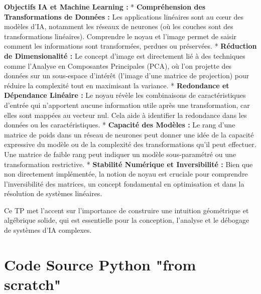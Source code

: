 \documentclass{report}
\begin{document}
\textbf{Objectifs IA et Machine Learning :}
*   \textbf{Compréhension des Transformations de Données :} Les applications linéaires sont au cœur des modèles d'IA, notamment les réseaux de neurones (où les couches sont des transformations linéaires). Comprendre le noyau et l'image permet de saisir comment les informations sont transformées, perdues ou préservées.
*   \textbf{Réduction de Dimensionalité :} Le concept d'image est directement lié à des techniques comme l'Analyse en Composantes Principales (PCA), où l'on projette des données sur un sous-espace d'intérêt (l'image d'une matrice de projection) pour réduire la complexité tout en maximisant la variance.
*   \textbf{Redondance et Dépendance Linéaire :} Le noyau révèle les combinaisons de caractéristiques d'entrée qui n'apportent aucune information utile après une transformation, car elles sont mappées au vecteur nul. Cela aide à identifier la redondance dans les données ou les caractéristiques.
*   \textbf{Capacité des Modèles :} Le rang d'une matrice de poids dans un réseau de neurones peut donner une idée de la capacité expressive du modèle ou de la complexité des transformations qu'il peut effectuer. Une matrice de faible rang peut indiquer un modèle sous-paramétré ou une transformation restrictive.
*   \textbf{Stabilité Numérique et Inversibilité :} Bien que non directement implémentée, la notion de noyau est cruciale pour comprendre l'inversibilité des matrices, un concept fondamental en optimisation et dans la résolution de systèmes linéaires.

Ce TP met l'accent sur l'importance de construire une intuition géométrique et algébrique solide, qui est essentielle pour la conception, l'analyse et le débogage de systèmes d'IA complexes.

\section*{Code Source Python "from scratch"}
\end{document}
